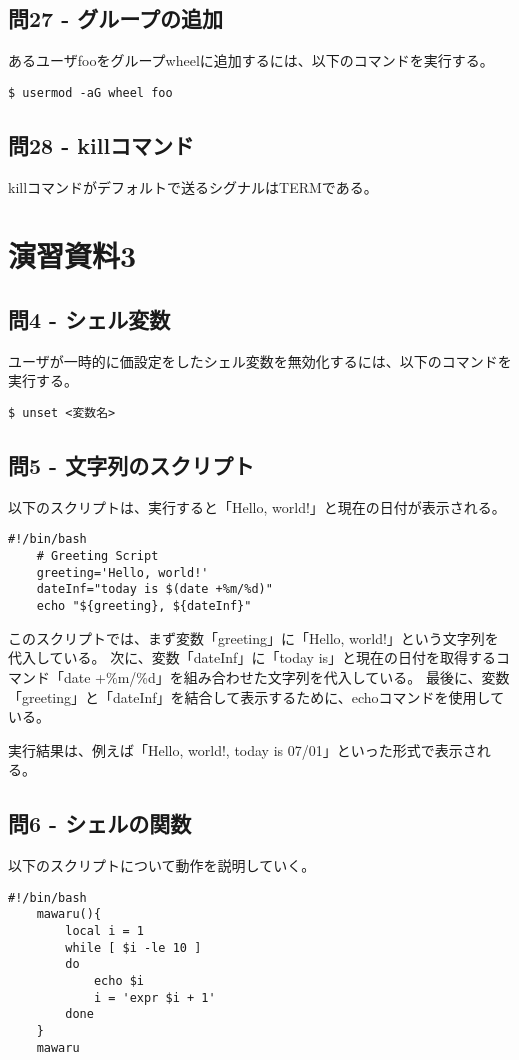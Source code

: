 \documentclass[a4paper,11pt]{jsarticle}
\begin{document}
\subsection*{問27 - グループの追加}
あるユーザfooをグループwheelに追加するには、以下のコマンドを実行する。
\begin{lstlisting}[caption=問27の解答]
    $ usermod -aG wheel foo
\end{lstlisting}

\subsection*{問28 - killコマンド}
killコマンドがデフォルトで送るシグナルはTERMである。

\section*{演習資料3}
\subsection*{問4 - シェル変数}
ユーザが一時的に価設定をしたシェル変数を無効化するには、以下のコマンドを実行する。
\begin{lstlisting}[caption=問4の解答]
    $ unset <変数名>
\end{lstlisting}

\subsection*{問5 - 文字列のスクリプト}
以下のスクリプトは、実行すると「Hello, world!」と現在の日付が表示される。

\begin{lstlisting}[caption=問4の解答]
    #!/bin/bash
    # Greeting Script
    greeting='Hello, world!'
    dateInf="today is $(date +%m/%d)"
    echo "${greeting}, ${dateInf}"
\end{lstlisting}

このスクリプトでは、まず変数「greeting」に「Hello, world!」という文字列を代入している。
次に、変数「dateInf」に「today is」と現在の日付を取得するコマンド「date +\%m/\%d」を組み合わせた文字列を代入している。
最後に、変数「greeting」と「dateInf」を結合して表示するために、echoコマンドを使用している。

実行結果は、例えば「Hello, world!, today is 07/01」といった形式で表示される。

\subsection*{問6 - シェルの関数}
以下のスクリプトについて動作を説明していく。
\begin{lstlisting}[caption=問6の解答]
    #!/bin/bash
    mawaru(){
        local i = 1
        while [ $i -le 10 ]
        do
            echo $i
            i = 'expr $i + 1'
        done
    }
    mawaru
\end{lstlisting}
\end{document}
